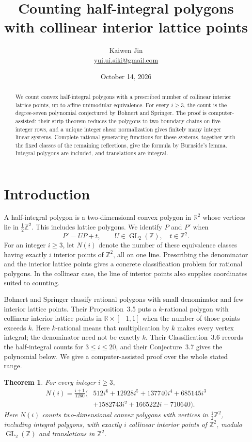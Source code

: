 \documentclass[11pt]{article}
\title{Counting half-integral polygons with collinear interior lattice points}
\author{Kaiwen Jin\\\small\href{mailto:yui.ui.siki@gmail.com}{yui.ui.siki@gmail.com}}
\date{October 14, 2026}
\newtheorem{theorem}{Theorem}[section]
\theoremstyle{remark}
\numberwithin{equation}{section}
\newcommand{\Z}{\mathbb Z}
\newcommand{\R}{\mathbb R}
\newcommand{\GL}{\operatorname{GL}}
\begin{document}
\maketitle
\begin{abstract}
We count convex half-integral polygons with a prescribed number of collinear
interior lattice points, up to affine unimodular equivalence. For every
$i\geq3$, the count is the degree-seven polynomial conjectured by Bohnert and
Springer. The proof is computer-assisted: their strip theorem reduces the
polygons to two boundary chains on five integer rows, and a unique integer
shear normalization gives finitely many integer linear systems.
Complete rational generating functions for these systems, together with the
fixed classes of the remaining reflections, give the formula by Burnside's
lemma. Integral polygons are included, and translations are integral.
\end{abstract}

\section{Introduction}\label{sec:introduction}

A half-integral polygon is a two-dimensional convex polygon in $\R^2$ whose
vertices lie in $\tfrac12\Z^2$. This includes lattice polygons.
We identify $P$ and $P'$ when
\[
 P'=UP+t,\qquad U\in\GL_2(\Z),\quad t\in\Z^2.
\]
For an integer $i\geq3$, let $N(i)$ denote the number of these equivalence
classes having exactly $i$ interior points of $\Z^2$, all on one line.
Prescribing the denominator and the interior lattice points gives a concrete
classification problem for rational polygons. In the collinear case, the
line of interior points also supplies coordinates suited to counting.

Bohnert and Springer \cite{BS} classify rational polygons with small
denominator and few interior lattice points. Their Proposition~3.5 puts a
$k$-rational polygon with collinear interior lattice points in
$\R\times[-1,1]$ when the number of those points exceeds $k$.
Here $k$-rational means that multiplication by $k$ makes every vertex
integral; the denominator need not be exactly $k$.
Their Classification~3.6 records the half-integral counts for
$3\leq i\leq20$, and their Conjecture~3.7 gives the polynomial below.
We give a computer-assisted proof over the whole stated range.

\begin{theorem}\label{thm:main}
For every integer $i\geq3$,
\begin{equation}\label{eq:main}
\begin{split}
 N(i)=\frac{i+1}{1260}\bigl(&512i^6+12928i^5+137740i^4+685145i^3\\
                         &+1582743i^2+1665222i+710640\bigr).
\end{split}
\end{equation}
Here $N(i)$ counts two-dimensional convex polygons with vertices in
$\tfrac12\Z^2$, including integral polygons, with exactly $i$ collinear
interior points of $\Z^2$, modulo $\GL_2(\Z)$ and translations in $\Z^2$.
\end{theorem}
\end{document}
